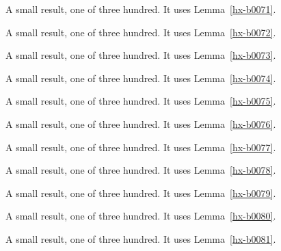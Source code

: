 \begin{lemma}[Bulk 72]\label{hx-b0072}
A small result, one of three hundred. It uses Lemma~\ref{hx-b0071}.
\end{lemma}

\begin{lemma}[Bulk 73]\label{hx-b0073}
A small result, one of three hundred. It uses Lemma~\ref{hx-b0072}.
\end{lemma}

\begin{lemma}[Bulk 74]\label{hx-b0074}
A small result, one of three hundred. It uses Lemma~\ref{hx-b0073}.
\end{lemma}

\begin{lemma}[Bulk 75]\label{hx-b0075}
A small result, one of three hundred. It uses Lemma~\ref{hx-b0074}.
\end{lemma}

\begin{lemma}[Bulk 76]\label{hx-b0076}
A small result, one of three hundred. It uses Lemma~\ref{hx-b0075}.
\end{lemma}

\begin{lemma}[Bulk 77]\label{hx-b0077}
A small result, one of three hundred. It uses Lemma~\ref{hx-b0076}.
\end{lemma}

\begin{lemma}[Bulk 78]\label{hx-b0078}
A small result, one of three hundred. It uses Lemma~\ref{hx-b0077}.
\end{lemma}

\begin{lemma}[Bulk 79]\label{hx-b0079}
A small result, one of three hundred. It uses Lemma~\ref{hx-b0078}.
\end{lemma}

\begin{lemma}[Bulk 80]\label{hx-b0080}
A small result, one of three hundred. It uses Lemma~\ref{hx-b0079}.
\end{lemma}

\begin{lemma}[Bulk 81]\label{hx-b0081}
A small result, one of three hundred. It uses Lemma~\ref{hx-b0080}.
\end{lemma}

\begin{lemma}[Bulk 82]\label{hx-b0082}
A small result, one of three hundred. It uses Lemma~\ref{hx-b0081}.
\end{lemma}

